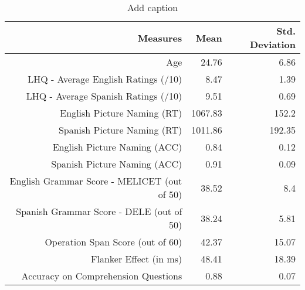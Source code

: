 \begin{table}[htbp]
  \centering
  \caption{Add caption}
    \begin{tabular}{rrr}
    \toprule
    Measures & Mean  & Std. Deviation \\
    \midrule
    Age   & 24.76 & 6.86 \\
    LHQ - Average English Ratings (/10) & 8.47  & 1.39 \\
    LHQ - Average Spanish Ratings (/10) & 9.51  & 0.69 \\
    English Picture Naming (RT) & 1067.83 & 152.2 \\
    Spanish Picture Naming (RT) & 1011.86 & 192.35 \\
    English Picture Naming (ACC) & 0.84  & 0.12 \\
    Spanish Picture Naming (ACC) & 0.91  & 0.09 \\
    English Grammar Score - MELICET (out of 50) & 38.52 & 8.4 \\
    Spanish Grammar Score - DELE (out of 50) & 38.24 & 5.81 \\
    Operation Span Score (out of 60) & 42.37 & 15.07 \\
    Flanker Effect (in ms) & 48.41 & 18.39 \\
    Accuracy on Comprehension Questions & 0.88  & 0.07 \\
    \bottomrule
    \end{tabular}%
  \label{tab:addlabel}%
\end{table}%
